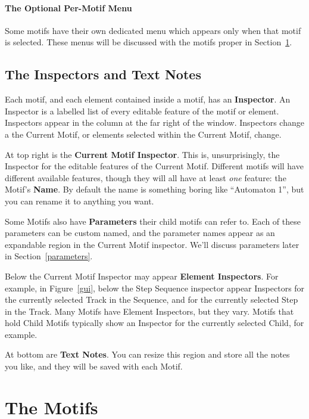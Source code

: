 \documentclass[twoside,10pt]{article}
\begin{document}
\paragraph{The Optional Per-Motif Menu}  Some motifs have their own dedicated menu which appears only when that motif is selected.  These menus will be discussed with the motifs proper in Section~\ref{motifs}.


\subsection{The Inspectors and Text Notes}

Each motif, and each element contained inside a motif, has an {\bf Inspector}.  An Inspector is a labelled list of every editable feature of the motif or element.  Inspectors appear in the column at the far right of the window.  Inspectors change a the Current Motif, or elements selected within the Current Motif, change.

At top right is the {\bf Current Motif Inspector}.  This is, unsurprisingly, the Inspector for the editable features of the Current Motif.  Different motifs will have different available features, though they will all have at least {\it one} feature: the Motif's {\bf Name}.  By default the name is something boring like ``Automaton 1'', but you can rename it to anything you want.

Some Motifs also have {\bf Parameters} their child motifs can refer to.  Each of these parameters can be custom named, and the parameter names appear as an expandable region in the Current Motif inspector.  We'll discuss parameters later in Section~\ref{parameters}.

Below the Current Motif Inspector may appear {\bf Element Inspectors}.  For example, in Figure~\ref{gui}, below the Step Sequence inspector appear Inspectors for the currently selected Track in the Sequence, and for the currently selected Step in the Track.  Many Motifs have Element Inspectors, but they vary.  Motifs that hold Child Motifs typically show an Inspector for the currently selected Child, for example.

At bottom are {\bf Text Notes}.  You can resize this region and store all the notes you like, and they will be saved with each Motif.

\clearpage\section{The Motifs}
\label{motifs}
\end{document}
